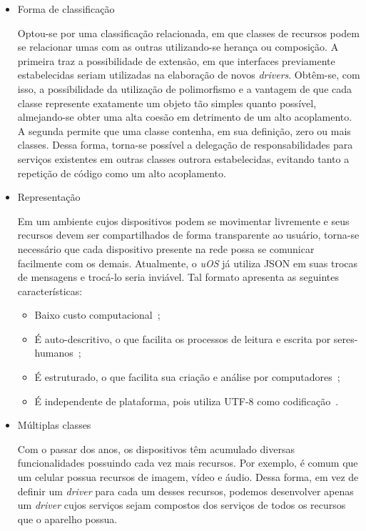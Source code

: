 \begin{itemize}
	\item Forma de classificação

	Optou-se por uma classificação relacionada, em que classes de recursos podem se relacionar umas com as outras utilizando-se herança ou composição. A primeira traz a possibilidade de extensão, em que interfaces previamente estabelecidas seriam utilizadas na elaboração de novos \emph{drivers}. Obtêm-se, com isso, a possibilidade da utilização de polimorfismo e a vantagem de que cada classe represente exatamente um objeto tão simples quanto possível, almejando-se obter uma alta coesão em detrimento de um alto acoplamento. A segunda permite que uma classe contenha, em sua definição, zero ou mais classes. Dessa forma, torna-se possível a delegação de responsabilidades para serviços existentes em outras classes outrora estabelecidas, evitando tanto a repetição de código como um alto acoplamento.

	\item Representação

	Em um ambiente cujos dispositivos podem se movimentar livremente e seus recursos devem ser compartilhados de forma transparente ao usuário, torna-se necessário que cada dispositivo presente na rede possa se comunicar facilmente com os demais. Atualmente, o \emph{uOS} já utiliza JSON em suas trocas de mensagens e trocá-lo seria inviável. Tal formato apresenta as seguintes características:
	
	\begin{itemize}
	 	\item Baixo custo computacional~\cite{comparativojson};
	 	\item É auto-descritivo, o que facilita os processos de leitura e escrita por seres-humanos~\cite{json};
	 	\item É estruturado, o que facilita sua criação e análise por computadores~\cite{json};
	 	\item É independente de plataforma, pois utiliza UTF-8 como codificação~\cite{utf8}.
	 \end{itemize}

	\item Múltiplas classes

	Com o passar dos anos, os dispositivos têm acumulado diversas funcionalidades possuindo cada vez mais recursos. Por exemplo, é comum que um celular possua recursos de imagem, vídeo e áudio. Dessa forma, em vez de definir um \emph{driver} para cada um desses recursos, podemos desenvolver apenas um \emph{driver} cujos serviços sejam compostos dos serviços de todos os recursos que o aparelho possua.
\end{itemize}

